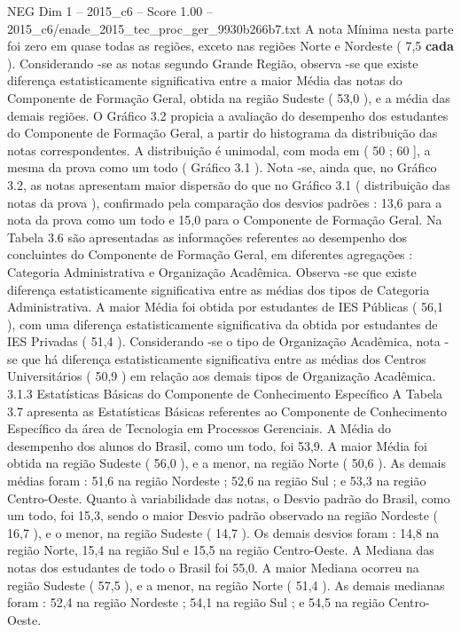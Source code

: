 \begin{textsample}{NEG Dim 1 – 2015\_c6 – Score 1.00 – 2015\_c6/enade\_2015\_tec\_proc\_ger\_9930b266b7.txt}
A nota Mínima nesta parte foi zero em quase todas as regiões, exceto nas regiões Norte e Nordeste ( 7,5 \textbf{cada} ).
Considerando -se as notas segundo Grande Região, observa -se que existe diferença estatisticamente significativa entre a maior Média das notas do Componente de Formação Geral, obtida na região Sudeste ( 53,0 ), e a média das demais regiões.
O Gráfico 3.2 propicia a avaliação do desempenho dos estudantes do Componente de Formação Geral, a partir do histograma da distribuição das notas correspondentes.
A distribuição é unimodal, com moda em ( 50 ; 60 ], a mesma da prova como um todo ( Gráfico 3.1 ).
Nota -se, ainda que, no Gráfico 3.2, as notas apresentam maior dispersão do que no Gráfico 3.1 ( distribuição das notas da prova ), confirmado pela comparação dos desvios padrões : 13,6 para a nota da prova como um todo e 15,0 para o Componente de Formação Geral.
Na Tabela 3.6 são apresentadas as informações referentes ao desempenho dos concluintes do Componente de Formação Geral, em diferentes agregações : Categoria Administrativa e Organização Acadêmica.
Observa -se que existe diferença estatisticamente significativa entre as médias dos tipos de Categoria Administrativa.
A maior Média foi obtida por estudantes de IES Públicas ( 56,1 ), com uma diferença estatisticamente significativa da obtida por estudantes de IES Privadas ( 51,4 ).
Considerando -se o tipo de Organização Acadêmica, nota -se que há diferença estatisticamente significativa entre as médias dos Centros Universitários ( 50,9 ) em relação aos demais tipos de Organização Acadêmica. 3.1.3 Estatísticas Básicas do Componente de Conhecimento Específico A Tabela 3.7 apresenta as Estatísticas Básicas referentes ao Componente de Conhecimento Específico da área de Tecnologia em Processos Gerenciais.
A Média do desempenho dos alunos do Brasil, como um todo, foi 53,9.
A maior Média foi obtida na região Sudeste ( 56,0 ), e a menor, na região Norte ( 50,6 ).
As demais médias foram : 51,6 na região Nordeste ; 52,6 na região Sul ; e 53,3 na região Centro-Oeste.
Quanto à variabilidade das notas, o Desvio padrão do Brasil, como um todo, foi 15,3, sendo o maior Desvio padrão observado na região Nordeste ( 16,7 ), e o menor, na região Sudeste ( 14,7 ).
Os demais desvios foram : 14,8 na região Norte, 15,4 na região Sul e 15,5 na região Centro-Oeste.
A Mediana das notas dos estudantes de todo o Brasil foi 55,0.
A maior Mediana ocorreu na região Sudeste ( 57,5 ), e a menor, na região Norte ( 51,4 ).
As demais medianas foram : 52,4 na região Nordeste ; 54,1 na região Sul ; e 54,5 na região Centro-Oeste.

\end{textsample}
